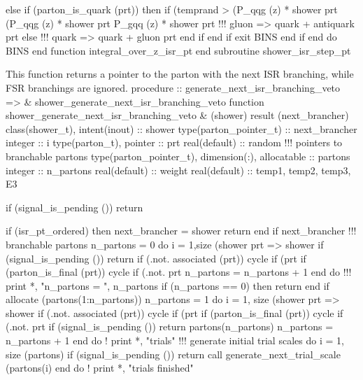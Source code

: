               else if (parton_is_quark (prt)) then
                 if (temprand > (P_qqg (z) * shower%
                      prt%
                      (P_qqg (z) * shower%
                      prt%
                      P_gqq (z) * shower%
                      prt%
                    !!! gluon => quark + antiquark
                    prt%
                 else
                    !!! quark => quark + gluon
                    prt%
                 end if
              end if
              exit BINS
           end if
        end do BINS
      end function integral_over_z_isr_pt
    end subroutine shower_isr_step_pt

\eatline
\nwendcode{}This function returns a pointer to the parton with the next ISR
branching, while FSR branchings are ignored.
\nwenddocs{}\plusendmoddef
  procedure :: generate_next_isr_branching_veto => &
       shower_generate_next_isr_branching_veto
\nwendcode{}\plusendmoddef
  function shower_generate_next_isr_branching_veto &
       (shower) result (next_brancher)
    class(shower_t), intent(inout) :: shower
    type(parton_pointer_t) :: next_brancher
    integer :: i
    type(parton_t),  pointer :: prt
    real(default) :: random
    !!! pointers to branchable partons
    type(parton_pointer_t), dimension(:), allocatable :: partons
    integer :: n_partons
    real(default) :: weight
    real(default) :: temp1, temp2, temp3, E3

    if (signal_is_pending ()) return

    if (isr_pt_ordered) then
       next_brancher = shower%
       return
    end if
    next_brancher%
    !!! branchable partons
    n_partons = 0
    do i = 1,size (shower%
       prt => shower%
       if (signal_is_pending ()) return
       if (.not. associated (prt)) cycle
       if (prt%
       if (parton_is_final (prt)) cycle
       if (.not. prt%
       n_partons = n_partons + 1
    end do
    !!! print *, "n_partons = ", n_partons
    if (n_partons == 0) then
       return
    end if
    allocate (partons(1:n_partons))
    n_partons = 1
    do i = 1, size (shower%
       prt => shower%
       if (.not. associated (prt)) cycle
       if (prt%
       if (parton_is_final (prt)) cycle
       if (.not. prt%
       if (signal_is_pending ()) return
       partons(n_partons)%
       n_partons = n_partons + 1
    end do
    ! print *, "trials"
    !!! generate initial trial scales
    do i = 1, size (partons)
       if (signal_is_pending ()) return
       call generate_next_trial_scale (partons(i)%
    end do
    ! print *, "trials finished"

